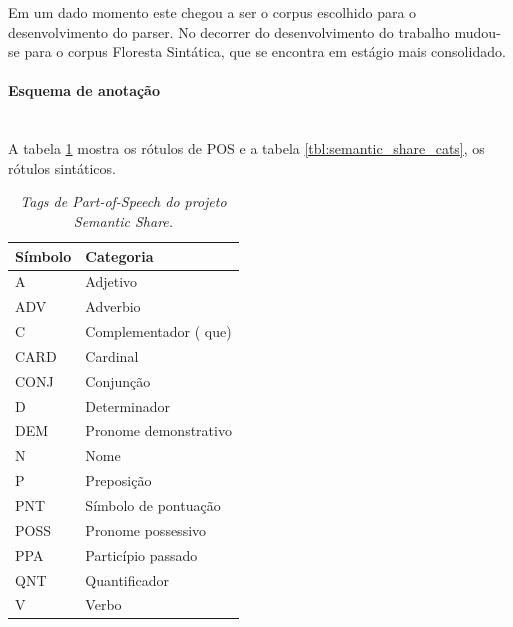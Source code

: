 Em um dado momento este chegou a ser o corpus escolhido para o desenvolvimento do parser. No decorrer do desenvolvimento do trabalho mudou-se para o corpus Floresta Sintática, que se encontra em estágio mais consolidado.

\paragraph{Esquema de anotação}\label{sub:semantic_anotacao}\hspace*{1in}\\

A tabela \ref{tbl:semantic_share_pos} mostra os rótulos de POS e a tabela \ref{tbl:semantic_share_cats}, os rótulos sintáticos.

\begin{table}

   \centering
   \small
   \caption{\it Tags de Part-of-Speech do projeto Semantic Share.}

    \begin{tabular}{ | p{3cm} | p{10cm} | }
      \hline
        \textbf{Símbolo} & \textbf{Categoria}\\
        \hline
        \hline

    A&Adjetivo\\
    \hline
    ADV&Adverbio\\
    \hline
    C&Complementador ( que)\\
    \hline
    CARD&Cardinal\\
    \hline
    CONJ&Conjunção\\
    \hline
    D&Determinador\\
    \hline
    DEM&Pronome demonstrativo\\
    \hline
    N&Nome\\
    \hline
    P&Preposição\\
    \hline
    PNT&Símbolo de pontuação\\
    \hline
    POSS&Pronome possessivo\\
    \hline
    PPA&Particípio passado\\
    \hline
    QNT& Quantificador\\
    \hline
    V& Verbo\\
    \hline


   \end{tabular}
\label{tbl:semantic_share_pos}      
\end{table}



